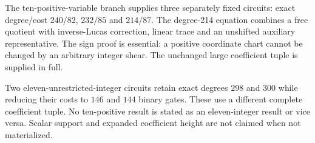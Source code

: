 The ten-positive-variable branch supplies three separately fixed
circuits: exact degree/cost $240/82$, $232/85$ and $214/87$.
The degree-214 equation combines a free quotient with inverse-Lucas
correction, linear trace and an unshifted auxiliary representative.
The sign proof is essential: a positive coordinate chart cannot be
changed by an arbitrary integer shear. The unchanged large coefficient
tuple is supplied in full.

Two eleven-unrestricted-integer circuits retain exact degrees $298$ and
$300$ while reducing their costs to $146$ and $144$ binary gates.
These use a different complete coefficient tuple. No ten-positive result
is stated as an eleven-integer result or vice versa. Scalar support and
expanded coefficient height are not claimed when not materialized.
